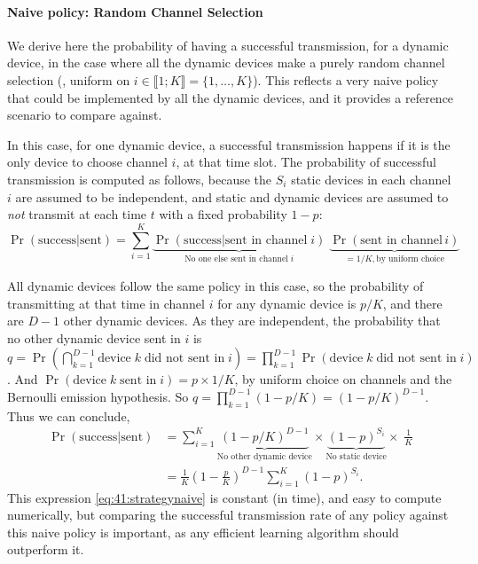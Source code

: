 \paragraph{Naive policy: Random Channel Selection}

We derive here the probability of having a successful transmission, for a dynamic device, in the case where all the dynamic devices make a purely random channel selection (\ie, uniform on $i \in \llbracket 1; K \rrbracket = \{1, \dots, K\}$).
This reflects a very naive policy that could be implemented by all the dynamic devices, and it provides a reference scenario to compare against.

In this case, for one dynamic device, a successful transmission happens if it is the only device to choose channel $i$, at that time slot.
The probability of successful transmission is computed as follows, because the $S_i$ static devices in each channel $i$ are assumed to be independent, and static and dynamic devices are assumed to \emph{not} transmit at each time $t$ with a fixed probability $1-p$:
\begin{equation}
    \Pr(\text{success}|\text{sent}) = \sum_{i=1}^{K} \underbrace{\Pr(\text{success}|\text{sent in channel}\;i)}_{\text{No one else sent in channel}\; i} \; \underbrace{\Pr(\text{sent in channel}\,i)}_{= 1/K, \text{by uniform choice}}
\end{equation}

All dynamic devices follow the same policy in this case, so the probability of transmitting at that time in channel $i$ for any dynamic device is $p / K$, and there are $D-1$ other dynamic devices.
As they are independent, the probability that no other dynamic device sent in $i$
is $q = \Pr(\bigcap_{k=1}^{D-1} \text{device}\;k\;\text{did not sent in}\;i) = \prod_{k=1}^{D-1} \Pr(\text{device}\;k\;\text{did not sent in}\;i)$. And $\Pr(\text{device}\;k\;\text{sent in}\;i) = p \times 1 / K$, by uniform choice on channels and the Bernoulli emission hypothesis. So $q = \prod_{k=1}^{D-1} (1 - p/K) = (1-p/K)^{D-1}$. Thus we can conclude,
%
\begin{align}\label{eq:41:strategynaive}
    \Pr(\text{success}|\text{sent})
    & = \sum_{i=1}^{K} \underbrace{(1 - p / K)^{D-1}}_{\text{No other dynamic device}} \times \underbrace{(1-p)^{S_i}}_{\text{No static device}} \times\; \frac{1}{K} \nonumber \\
    & = \frac{1}{K} \left(1-\frac{p}{K}\right)^{D-1} \sum_{i=1}^{K} (1-p)^{S_i} .
\end{align}
This expression \eqref{eq:41:strategynaive} is constant (in time), and easy to compute numerically, but comparing the successful transmission rate of any policy against this naive policy is important, as any efficient learning algorithm should outperform it.


